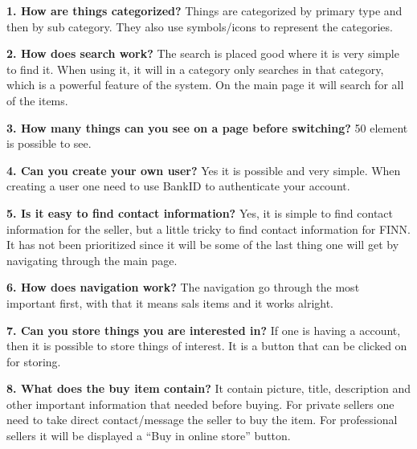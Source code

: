 \textbf{1.  How are things categorized?}
Things are categorized by primary type and then by sub category. They also use symbols/icons to represent the categories. 

\textbf{2.  How does search work?}
The search is placed good where it is very simple
to find it. When using it, it will in a category only searches in that category, which is a powerful feature of the system. On the main page it will search for all of the items. 

\textbf{3.  How many things can you see on a page before switching?}
50 element is possible to see. 

\textbf{4.  Can you create your own user?}
Yes it is possible and very simple. When creating a user one need to use BankID to authenticate your account.

\textbf{5.  Is it easy to find contact information?}
Yes, it is simple to find contact information for the seller, but a little tricky to find contact information for FINN. It has not been prioritized since it will be some of the last thing one will get by navigating through the main page. 

\textbf{6.  How does navigation work?}
The navigation go through the most important first, with that it means sals items and it works alright. 

\textbf{7.  Can you store things you are interested in?}
If one is having a account, then it is possible to store things of interest. It is a button that can be clicked on for storing. 

\textbf{8.  What does the buy item contain?}
It contain picture, title, description and other important information that needed before buying. For private sellers one need to take direct contact/message the seller to buy the item. For professional sellers it will be displayed a “Buy in online store” button.

\newpage
